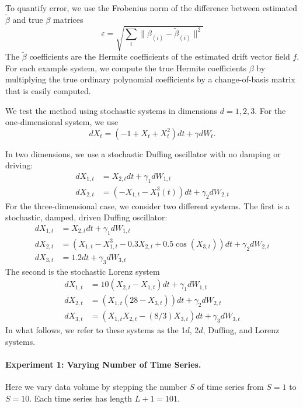 \documentclass{article}
\begin{document}
To quantify error, we use the Frobenius norm of the difference between estimated $\widetilde{\beta}$ and true $\beta$ matrices
\begin{equation}
\varepsilon = \sqrt{\sum_i \| \beta_{(i)} - \widetilde{\beta}_{(i)} \|^2 }
\end{equation}
The $\widetilde{\beta}$ coefficients are the Hermite coefficients of the estimated drift vector field $f$.  For each example system, we compute the true Hermite coefficients $\beta$ by multiplying the true ordinary polynomial coefficients by a change-of-basis matrix that is easily computed.

We test the method using stochastic systems in dimensions $d= 1, 2, 3$.
For the one-dimensional system, we use
\begin{equation*}
dX_t = (-1 + X_t + X_t^2 ) dt + \gamma dW_t.
\end{equation*}

In two dimensions, we use a stochastic Duffing oscillator with no damping or driving:
\begin{align*}
dX_{1,t} &= X_{2,t} dt + \gamma_1 dW_{1,t} \\
dX_{2,t} &= (-X_{1,t} - X^3_1(t)) dt + \gamma_2 dW_{2,t}
\end{align*}
For the three-dimensional case, we consider two different systems.  The first is a stochastic, damped, driven Duffing oscillator:
\begin{align*}
dX_{1,t} & = X_{2,t} dt + \gamma_1 dW_{1,t} \\
dX_{2,t} & = (X_{1,t} - X_{1,t}^3 - 0.3 X_{2,t} + 0.5 \cos (X_{3,t})) dt + \gamma_2 dW_{2,t} \\
dX_{3,t} & = 1.2 dt + \gamma_3 dW_{3,t}
\end{align*}
The second is the stochastic Lorenz system
\begin{align*}
dX_{1,t} & = 10 (X_{2,t} - X_{1,t}) dt + \gamma_1 dW_{1,t} \\
dX_{2,t} & = (X_{1,t} (28 - X_{3,t})) dt + \gamma_2 dW_{2,t} \\
dX_{3,t} & = (X_{1,t} X_{2,t} - (8/3) X_{3,t}) dt + \gamma_3 dW_{3,t}
\end{align*}
In what follows, we refer to these systems as the 1$d$, 2$d$, Duffing, and Lorenz systems.


\paragraph{Experiment 1: Varying Number of Time Series.} Here we vary data volume by stepping the number $S$ of time series from $S=1$ to $S=10$.  Each time series has length $L+1 = 101$.
\end{document}
